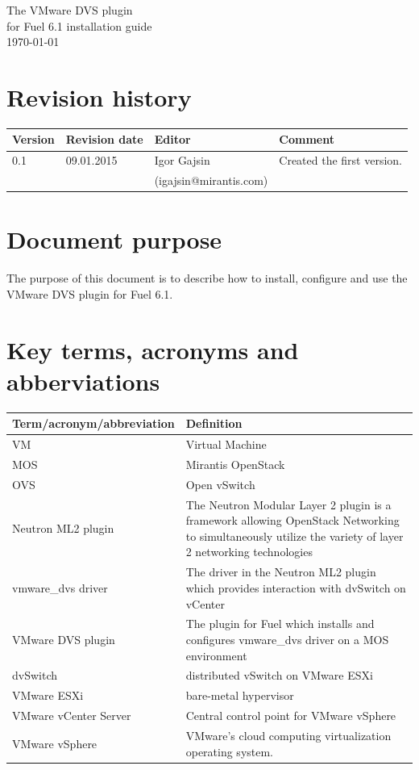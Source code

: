 \documentclass{article}
\newcommand*{\titleIG}{\begingroup
\centering
\vspace*{7\baselineskip}
\Huge
The VMware DVS plugin \\
for Fuel 6.1 installation guide \\
\vspace*{1.3\baselineskip}\hfill\today
\vfill
\pagenumbering{gobble}
\newpage
\pagenumbering{arabic}
\endgroup}
\begin{document}
\titleIG

\tableofcontents

\newpage

\section{Revision history}

\begin{table}[h]
\begin{tabular}{|p{4cm}|p{4cm}|p{4cm}|p{4cm}|}
\hline
Version & Revision date & Editor & Comment \\
\hline
0.1 & 09.01.2015 & Igor Gajsin & Created the first version.\\
 & & (igajsin@mirantis.com) & \\
\hline
\end{tabular}
\end{table}

\section{Document purpose}

The purpose of this document is to describe how to install, configure and use the VMware DVS plugin for Fuel 6.1.

\section{Key terms, acronyms and abberviations}

\begin{table}[h]
\begin{tabular}{|l|p{12cm}|}
\hline
\textbf{Term/acronym/abbreviation} & \textbf{Definition} \\
\hline
VM & Virtual Machine \\
\hline
MOS & Mirantis OpenStack \\
\hline
OVS & Open vSwitch \\
\hline
Neutron ML2 plugin & The Neutron Modular Layer 2 plugin is a framework allowing OpenStack Networking to simultaneously utilize the variety of layer 2 networking technologies \\
\hline
vmware\_dvs driver & The driver in the Neutron ML2 plugin which provides interaction with dvSwitch on vCenter \\
\hline
VMware DVS plugin & The plugin for Fuel which installs and configures vmware\_dvs driver on a MOS environment \\
\hline
dvSwitch & distributed vSwitch on VMware ESXi \\
\hline
VMware ESXi & bare-metal hypervisor \\
\hline
VMware vCenter Server & Central control point for VMware vSphere \\
\hline
VMware vSphere & VMware's cloud computing virtualization operating system. \\
\hline
\end{tabular}
\end{table}
\end{document}
